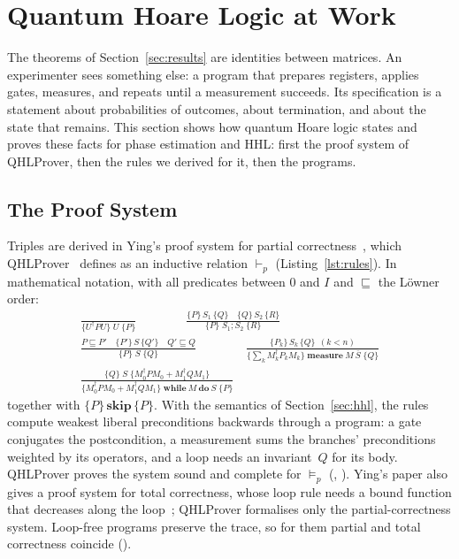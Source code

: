 \section{Quantum Hoare Logic at Work}\label{sec:programs}

The theorems of Section~\ref{sec:results} are identities between matrices. An experimenter sees
something else: a program that prepares registers, applies gates, measures, and repeats until a
measurement succeeds. Its specification is a statement about probabilities of outcomes, about
termination, and about the state that remains. This section shows how quantum Hoare logic states and
proves these facts for phase estimation and HHL: first the proof system of QHLProver, then the rules we
derived for it, then the programs.

\subsection{The Proof System}\label{sec:qhl-rules}

Triples are derived in Ying's proof system for partial correctness~\cite{ying2011}, which
QHLProver~\cite{liu2019qhl} defines as an inductive relation $\vdash_p$ (Listing~\ref{lst:rules}). In mathematical notation, with all
predicates between $0$ and $I$ and $\sqsubseteq$ the L\"owner order:
\begin{gather*}
\frac{}{\{U^\dagger PU\}\;U\;\{P\}}\qquad\qquad
\frac{\{P\}\,S_1\,\{Q\}\quad\{Q\}\,S_2\,\{R\}}{\{P\}\;S_1;S_2\;\{R\}}\\[0.5em]
\frac{P\sqsubseteq P'\quad\{P'\}\,S\,\{Q'\}\quad Q'\sqsubseteq Q}{\{P\}\;S\;\{Q\}}\qquad\qquad
\frac{\{P_k\}\,S_k\,\{Q\}\ \ (k<n)}{\{\textstyle\sum_kM_k^\dagger P_kM_k\}\;\mathbf{measure}\ M\ \bar S\;\{Q\}}\\[0.5em]
\frac{\{Q\}\;S\;\{M_0^\dagger PM_0+M_1^\dagger QM_1\}}{\{M_0^\dagger PM_0+M_1^\dagger QM_1\}\;\mathbf{while}\ M\ \mathbf{do}\ S\;\{P\}}
\end{gather*}
together with $\{P\}\,\mathbf{skip}\,\{P\}$. With the semantics of Section~\ref{sec:hhl}, the rules compute weakest liberal preconditions backwards
through a program: a gate conjugates the postcondition, a measurement sums the branches' preconditions
weighted by its operators, and a loop needs an invariant~$Q$ for its body. QHLProver proves the system
sound and complete for $\models_p$ (, ). Ying's paper
also gives a proof system for total correctness, whose loop rule needs a bound function that decreases
along the loop~\cite{ying2011}; QHLProver formalises only the partial-correctness system.
Loop-free programs preserve the trace, so for them partial and total correctness coincide
().

